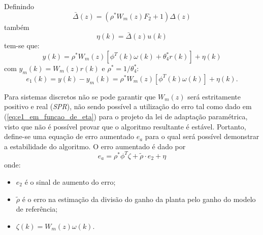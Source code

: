     Definindo
    \begin{equation*}
        \bar{\Delta}(z) = \left( \rho^* W_m(z) F_2 + 1 \right) \Delta(z)
    \end{equation*}
    também
    \begin{equation*}
        \eta(k) = \bar{\Delta}(z) u(k)
    \end{equation*}
    tem-se que:
    \begin{equation*}
        y(k) = \rho^* W_m(z) \left[ \phi^T(k) \omega(k) + \theta_4^* r(k) \right] + \eta(k)
    \end{equation*}
    com $y_m(k) = W_m(z) r(k)$ e $\rho^* = 1/\theta_4^*$:
    \begin{equation}
        e_1(k) = y(k) - y_m(k) = \rho^* W_m(z) \left[ \phi^T(k) \omega(k) \right] + \eta(k) \text{.}
        \label{eq:e1_em_funcao_de_eta}
    \end{equation}

    Para sistemas discretos não se pode garantir que $W_m(z)$ será estritamente positivo e real
    (\emph{SPR}), não sendo possível a utilização do erro tal como dado em
    (\ref{eq:e1_em_funcao_de_eta}) para o projeto da lei de adaptação paramétrica, visto que
    não é possível provar que o algoritmo resultante é estável. Portanto, define-se uma equação
    de erro aumentado $e_a$ para o qual será possível demonstrar a estabilidade do algoritmo.
    O erro aumentado é dado por
    \begin{equation}
        e_a = \rho^* \phi^T \zeta + \tilde{\rho} \cdot e_2 + \eta
        \label{eq:ea_erro_aumentado}
    \end{equation}
    onde:
    \begin{itemize}[leftmargin=+2cm]
        \item[] $e_2$ é o sinal de aumento do erro;
        \item[] $\tilde{\rho}$ é o erro na estimação da divisão do ganho da planta
            pelo ganho do modelo de referência;
        \item[] $\zeta(k) = W_m(z) \omega(k) \text{.}$
    \end{itemize}

